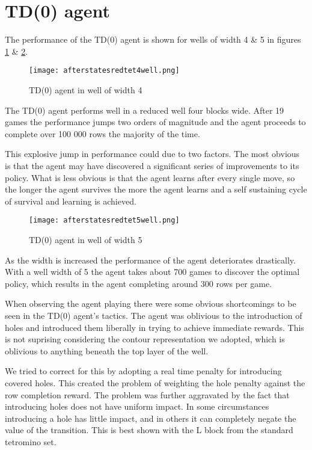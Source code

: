 \documentclass{rucsthesis}
\begin{document}
\section{TD(0) agent}

The performance of the TD(0) agent is shown for wells of width 4 \& 5 in figures \ref{fig:afterstatesredtet4well} \& \ref{fig:afterstatesredtet5well}.

\begin{figure}[h]
\centering
\texttt{[image: afterstatesredtet4well.png]}
\caption{TD(0) agent in well of width 4}
\label{fig:afterstatesredtet4well}
\end{figure}

The TD(0) agent performs well in a reduced well four blocks wide. After 19 games the performance jumps two orders of magnitude and the agent proceeds to complete over 100 000 rows the majority of the time. 

This explosive jump in performance could due to two factors. The most obvious is that the agent may have discovered a significant series of improvements to its policy. What is less obvious is that the agent learns after every single move, so the longer the agent survives the more the agent learns and a self sustaining cycle of survival and learning is achieved.

\begin{figure}[h]
\centering
\texttt{[image: afterstatesredtet5well.png]}
\caption{TD(0) agent in well of width 5}
\label{fig:afterstatesredtet5well}
\end{figure}

As the width is increased the performance of the agent deteriorates drastically. With a well width of 5 the agent takes about 700 games to discover the optimal policy, which results in the agent completing around 300 rows per game.

When observing the agent playing there were some obvious shortcomings to be seen in the TD(0) agent's tactics. The agent was oblivious to the introduction of holes and introduced them liberally in trying to achieve immediate rewards. This is not suprising considering the contour representation we adopted, which is oblivious to anything beneath the top layer of the well. 

We tried to correct for this by adopting a real time penalty for introducing covered holes. This created the problem of weighting the hole penalty against the row completion reward. The problem was further aggravated by the fact that introducing holes does not have uniform impact. In some circumstances introducing a hole has little impact, and in others it can completely negate the value of the transition. This is best shown with the L block from the standard tetromino set. 
\end{document}
